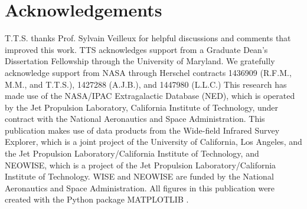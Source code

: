 \documentclass[fleqn, usenatbib]{mnras}
\begin{document}
\section*{Acknowledgements}
T.T.S. thanks Prof. Sylvain Veilleux for helpful discussions and comments that improved this work. TTS acknowledges support from a Graduate Dean's Dissertation Fellowship through the University of Maryland. We gratefully acknowledge support from NASA through Herschel contracts 1436909 (R.F.M., M.M., and T.T.S.), 1427288 (A.J.B.), and 1447980 (L.L.C.) This research has made use of the NASA/IPAC Extragalactic Database (NED), which is operated by the Jet Propulsion Laboratory, California Institute of Technology, under contract with the National Aeronautics and Space Administration. This publication makes use of data products from the Wide-field Infrared Survey Explorer, which is a joint project of the University of California, Los Angeles, and the Jet Propulsion Laboratory/California Institute of Technology, and NEOWISE, which is a project of the Jet Propulsion Laboratory/California Institute of Technology. WISE and NEOWISE are funded by the National Aeronautics and Space Administration. All figures in this publication were created with the Python package \textsc{MATPLOTLIB} \citep{Hunter:2007}. 






\appendix
\end{document}
